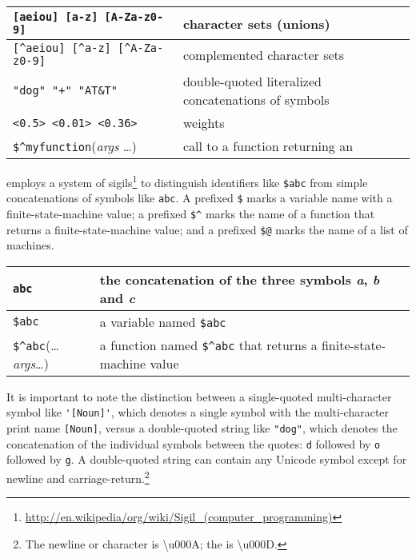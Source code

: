 \vspace{0.5cm}

\noindent
\begin{tabular}{|l|p{7.2cm}|}
\hline
\verb![aeiou] [a-z] [A-Za-z0-9]! & character sets (unions)\\
\hline
\verb![^aeiou] [^a-z] [^A-Za-z0-9]! & complemented character sets\\
\hline
\verb!"dog" "+" "AT&T"! & double-quoted literalized concatenations of symbols\\
\hline
\verb!<0.5> <0.01> <0.36>! &  weights\\
\hline
\verb!$^myfunction!(\textit{args} \ldots) & call to a function returning
an \fsm{}\\
\hline
\end{tabular}

\vspace{0.5cm}

\Kleene{} employs a system of
sigils\footnote{\url{http://en.wikipedia/org/wiki/Sigil_(computer_programming)}}
to distinguish identifiers like \verb!$abc! from simple concatenations of symbols 
like \verb!abc!.  A prefixed
\verb!$! marks a variable name with a finite-state-machine value; a prefixed
\verb!$^! marks the
name of a function that returns a finite-state-machine value; and a prefixed \verb!$@! marks the name of
a list of machines.

\vspace{0.5cm} 

\begin{center}
\begin{tabular}{|l|p{8cm}|}
\hline
\verb!abc! & the concatenation of the three symbols \emph{a}, \emph{b} and \emph{c} \\
\hline
\verb!$abc! & a variable named \verb!$abc! \\
\hline
\verb!$^abc!(\ldots{}\textit{args}\ldots{}) & a function named
\verb!$^abc! that returns a finite-state-machine value\\
\hline
\end{tabular}
\end{center}

\vspace{0.5cm}

It is important to note the distinction between a single-quoted
multi-character symbol like \verb!'[Noun]'!, which denotes a single
symbol with the multi-character print name \verb![Noun]!, versus a
double-quoted string like \verb!"dog"!, which denotes the concatenation of
the individual symbols between the quotes: \texttt{d} followed by \texttt{o} followed by
\texttt{g}.  A double-quoted string can
contain any Unicode  symbol except for newline and
carriage-return.\footnote{The newline or  character is
\textbackslash{}u000A; the  is
\textbackslash{}u000D.}

